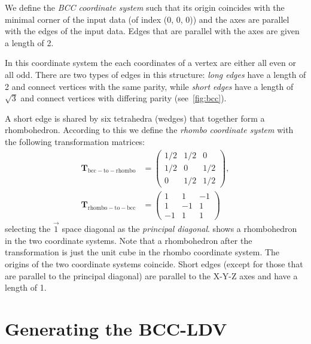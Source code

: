 \documentclass[journal]{vgtc}                     %
\begin{document}
We define the \emph{BCC coordinate system} such that its origin coincides with the minimal corner of the input data (of index (0, 0, 0)) and the axes are parallel with the edges of the input data. Edges that are parallel with the axes are given a length of 2.

In this coordinate system the each coordinates of a vertex are either all even or all odd. There are two types of edges in this structure: \emph{long edges} have a length of 2 and connect vertices with the same parity, while \emph{short edges} have a length of $\sqrt{3}$ and connect vertices with differing parity (see~\cref{fig:bcc}).

A short edge is shared by six tetrahedra (wedges) that together form a rhombohedron. According to this we define the \emph{rhombo coordinate system} with the following transformation matrices: 
\begin{equation*}
	\begin{split}
		\mathbf{T}_{\mathrm{bcc-to-rhombo}} &=
		\left(
		\begin{array}{ccc}
			1/2 & 1/2 & 0 \\
			1/2 & 0 & 1/2 \\
			0 & 1/2 & 1/2
		\end{array}
		\right), \\
		\mathbf{T}_{\mathrm{rhombo-to-bcc}} &=
		\left(
		\begin{array}{ccc}
			1 & 1 & -1 \\
			1 & -1 & 1 \\
			-1 & 1 & 1
		\end{array}
		\right)
	\end{split}
\end{equation*}
selecting the $\vec{1}$ space diagonal as the \emph{principal diagonal}.  shows a rhombohedron in the two coordinate systems. Note that a rhombohedron after the transformation is just the unit cube in the rhombo coordinate system. The origins of the two coordinate systems coincide. Short edges (except for those that are parallel to the principal diagonal) are parallel to the X-Y-Z axes and have a length of 1.

\section{Generating the BCC-LDV}
\end{document}
